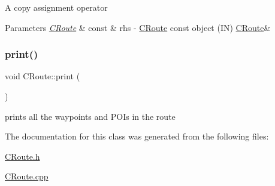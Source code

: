 A copy assignment operator 
\begin{DoxyParams}{Parameters}
{\em \hyperlink{classCRoute}{C\+Route}} & const \& rhs -\/ \hyperlink{classCRoute}{C\+Route} const object (IN)  \hyperlink{classCRoute}{C\+Route}\& \\
\hline
\end{DoxyParams}
\mbox{\label{classCRoute_ac414ab61fe61cf703eb6225b25d9f09c}} 
\subsubsection{\texorpdfstring{print()}{print()}}
{\footnotesize\ttfamily void C\+Route\+::print (\begin{DoxyParamCaption}{ }\end{DoxyParamCaption})}

prints all the waypoints and P\+O\+Is in the route 

The documentation for this class was generated from the following files\+:\begin{DoxyCompactItemize}
\item 
\hyperlink{CRoute_8h}{C\+Route.\+h}\item 
\hyperlink{CRoute_8cpp}{C\+Route.\+cpp}\end{DoxyCompactItemize}
